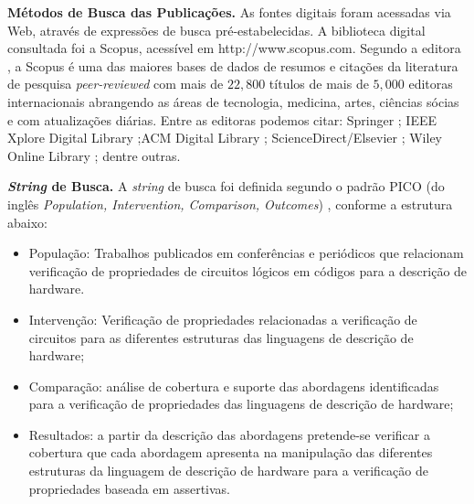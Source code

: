 \textbf{Métodos de Busca das Publicações.} As fontes digitais foram acessadas via Web, através de expressões de busca pré-estabelecidas. A biblioteca digital consultada foi a Scopus, acessível em http://www.scopus.com. Segundo a editora \citeauthor{Elsevier}, a Scopus é uma das maiores bases de dados de resumos e citações da literatura de pesquisa \textit{peer-reviewed} com mais de $22,800$ títulos de mais de $5,000$ editoras internacionais abrangendo as áreas de tecnologia, medicina, artes, ciências sócias e com atualizações diárias. Entre as editoras podemos citar: Springer \cite{Springer}; IEEE Xplore Digital Library \cite{IEEE};ACM Digital Library \cite{ACM} ; ScienceDirect/Elsevier \cite{B.V}; Wiley Online Library \cite{Sons}; dentre outras.

\textbf{\textit{String} de Busca.} A \textit{string} de busca foi definida segundo o padrão PICO (do inglês \textit{Population, Intervention, Comparison, Outcomes}) \cite{kitchenham2009systematic}, conforme a estrutura abaixo:
\begin{itemize}
	\item População: Trabalhos publicados em conferências e periódicos que relacionam verificação de propriedades de circuitos lógicos em códigos para a descrição de hardware.

	\item Intervenção: Verificação de propriedades relacionadas a verificação de circuitos para as diferentes estruturas das linguagens de descrição de hardware;

	\item Comparação: análise de cobertura e suporte das abordagens identificadas para a verificação de propriedades das linguagens de descrição de hardware;

	\item Resultados: a partir da descrição das abordagens pretende-se verificar a cobertura que cada abordagem apresenta na manipulação das diferentes estruturas da linguagem de descrição de hardware para a verificação de propriedades baseada em assertivas.
\end{itemize}

